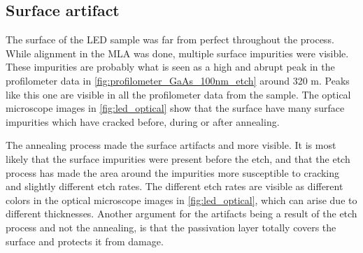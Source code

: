 



\subsection{Surface artifact}
\label{sec:discussion:surface_artifact}

The surface of the LED sample was far from perfect throughout the process.
While alignment in the MLA was done, multiple surface impurities were visible. 
These impurities are probably what is seen as a high and abrupt peak in the profilometer data in \autoref{fig:profilometer_GaAs_100nm_etch} around 320 \textmu m.
Peaks like this one are visible in all the profilometer data from the sample. 
The optical microscope images in \autoref{fig:led_optical} show that the surface have many surface impurities which have cracked before, during or after annealing. 


The annealing process made the surface artifacts and more visible.
It is most likely that the surface impurities were present before the etch, and that the etch process has made the area around the impurities more susceptible to cracking and slightly different etch rates.
The different etch rates are visible as different colors in the optical microscope images in \autoref{fig:led_optical}, which can arise due to different thicknesses. 
Another argument for the artifacts being a result of the etch process and not the annealing, is that the passivation layer totally covers the surface and protects it from damage. 




